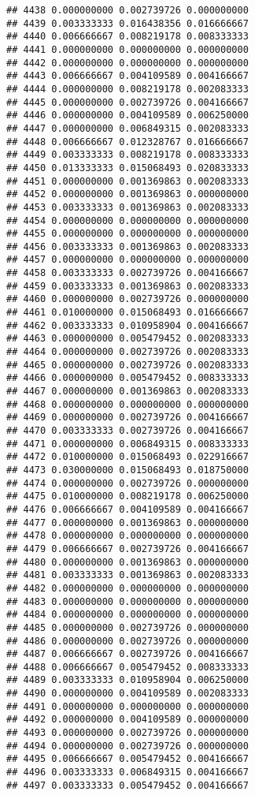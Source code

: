 \documentclass[
]{article}
\begin{document}
\begin{verbatim}
## 4438 0.000000000 0.002739726 0.000000000
## 4439 0.003333333 0.016438356 0.016666667
## 4440 0.006666667 0.008219178 0.008333333
## 4441 0.000000000 0.000000000 0.000000000
## 4442 0.000000000 0.000000000 0.000000000
## 4443 0.006666667 0.004109589 0.004166667
## 4444 0.000000000 0.008219178 0.002083333
## 4445 0.000000000 0.002739726 0.004166667
## 4446 0.000000000 0.004109589 0.006250000
## 4447 0.000000000 0.006849315 0.002083333
## 4448 0.006666667 0.012328767 0.016666667
## 4449 0.003333333 0.008219178 0.008333333
## 4450 0.013333333 0.015068493 0.020833333
## 4451 0.000000000 0.001369863 0.002083333
## 4452 0.000000000 0.001369863 0.000000000
## 4453 0.003333333 0.001369863 0.002083333
## 4454 0.000000000 0.000000000 0.000000000
## 4455 0.000000000 0.000000000 0.000000000
## 4456 0.003333333 0.001369863 0.002083333
## 4457 0.000000000 0.000000000 0.000000000
## 4458 0.003333333 0.002739726 0.004166667
## 4459 0.003333333 0.001369863 0.002083333
## 4460 0.000000000 0.002739726 0.000000000
## 4461 0.010000000 0.015068493 0.016666667
## 4462 0.003333333 0.010958904 0.004166667
## 4463 0.000000000 0.005479452 0.002083333
## 4464 0.000000000 0.002739726 0.002083333
## 4465 0.000000000 0.002739726 0.002083333
## 4466 0.000000000 0.005479452 0.008333333
## 4467 0.000000000 0.001369863 0.002083333
## 4468 0.000000000 0.000000000 0.000000000
## 4469 0.000000000 0.002739726 0.004166667
## 4470 0.003333333 0.002739726 0.004166667
## 4471 0.000000000 0.006849315 0.008333333
## 4472 0.010000000 0.015068493 0.022916667
## 4473 0.030000000 0.015068493 0.018750000
## 4474 0.000000000 0.002739726 0.000000000
## 4475 0.010000000 0.008219178 0.006250000
## 4476 0.006666667 0.004109589 0.004166667
## 4477 0.000000000 0.001369863 0.000000000
## 4478 0.000000000 0.000000000 0.000000000
## 4479 0.006666667 0.002739726 0.004166667
## 4480 0.000000000 0.001369863 0.000000000
## 4481 0.003333333 0.001369863 0.002083333
## 4482 0.000000000 0.000000000 0.000000000
## 4483 0.000000000 0.000000000 0.000000000
## 4484 0.000000000 0.000000000 0.000000000
## 4485 0.000000000 0.002739726 0.000000000
## 4486 0.000000000 0.002739726 0.000000000
## 4487 0.006666667 0.002739726 0.004166667
## 4488 0.006666667 0.005479452 0.008333333
## 4489 0.003333333 0.010958904 0.006250000
## 4490 0.000000000 0.004109589 0.002083333
## 4491 0.000000000 0.000000000 0.000000000
## 4492 0.000000000 0.004109589 0.000000000
## 4493 0.000000000 0.002739726 0.000000000
## 4494 0.000000000 0.002739726 0.000000000
## 4495 0.006666667 0.005479452 0.004166667
## 4496 0.003333333 0.006849315 0.004166667
## 4497 0.003333333 0.005479452 0.004166667

\end{verbatim}
\end{document}
